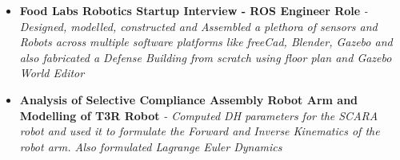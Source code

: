 \documentclass{article}
\begin{document}
\begin{itemize}
        \item{\textbf{\large{Food Labs Robotics Startup Interview - ROS Engineer Role}}}
        \newline
        \textit{- Designed, modelled, constructed and
        Assembled a plethora of sensors and Robots across multiple software platforms like
        freeCad, Blender, Gazebo and also fabricated a Defense Building from scratch using floor plan and Gazebo World Editor}
    
        \item{\textbf{\large{Analysis of Selective Compliance Assembly Robot Arm and Modelling of T3R Robot}}}
        \newline
        \textit{- Computed DH parameters for the SCARA robot and used it to formulate the Forward and Inverse Kinematics of the robot arm. Also formulated Lagrange Euler Dynamics}
    \end{itemize}
\end{document}
